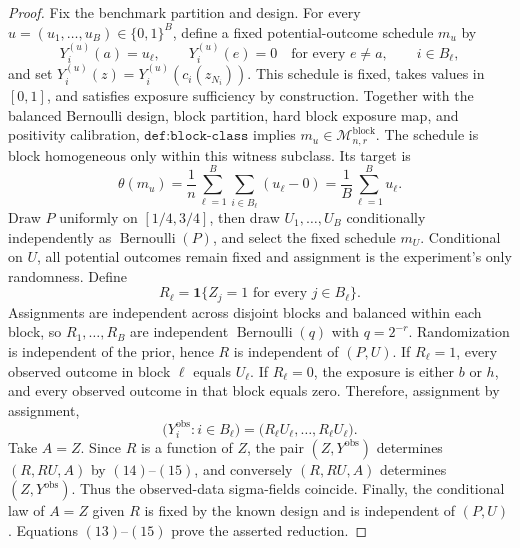\documentclass{article}
\begin{document}
\begin{proof}
Fix the benchmark partition and design. For every \(u=(u_1,\ldots,u_B)\in\{0,1\}^B\), define a fixed potential-outcome schedule \(m_u\) by
\[
Y_i^{(u)}(a)=u_\ell,
\qquad
Y_i^{(u)}(e)=0\quad\text{for every }e\ne a,
\qquad i\in B_\ell,
\tag{12}
\]
and set \(Y_i^{(u)}(z)=Y_i^{(u)}(c_i(z_{N_i}))\). This schedule is fixed, takes values in \([0,1]\), and satisfies exposure sufficiency by construction. Together with the balanced Bernoulli design, block partition, hard block exposure map, and positivity calibration, \(\texttt{def:block-class}\) implies \(m_u\in\mathcal M_{n,r}^{\mathrm{block}}\). The schedule is block homogeneous only within this witness subclass. Its target is
\[
\theta(m_u)
=\frac1n\sum_{\ell=1}^B\sum_{i\in B_\ell}(u_\ell-0)
=\frac1B\sum_{\ell=1}^B u_\ell.
\tag{13}
\]
Draw \(P\) uniformly on \([1/4,3/4]\), then draw \(U_1,\ldots,U_B\) conditionally independently as \(\operatorname{Bernoulli}(P)\), and select the fixed schedule \(m_U\). Conditional on \(U\), all potential outcomes remain fixed and assignment is the experiment's only randomness. Define
\[
R_\ell=\mathbf 1\{Z_j=1\text{ for every }j\in B_\ell\}.
\tag{14}
\]
Assignments are independent across disjoint blocks and balanced within each block, so \(R_1,\ldots,R_B\) are independent \(\operatorname{Bernoulli}(q)\) with \(q=2^{-r}\). Randomization is independent of the prior, hence \(R\) is independent of \((P,U)\). If \(R_\ell=1\), every observed outcome in block \(\ell\) equals \(U_\ell\). If \(R_\ell=0\), the exposure is either \(b\) or \(h\), and every observed outcome in that block equals zero. Therefore, assignment by assignment,
\[
\bigl(Y_i^{\mathrm{obs}}:i\in B_\ell\bigr)
=\bigl(R_\ell U_\ell,\ldots,R_\ell U_\ell\bigr).
\tag{15}
\]
Take \(A=Z\). Since \(R\) is a function of \(Z\), the pair \((Z,Y^{\mathrm{obs}})\) determines \((R,RU,A)\) by \((14)\)--\((15)\), and conversely \((R,RU,A)\) determines \((Z,Y^{\mathrm{obs}})\). Thus the observed-data sigma-fields coincide. Finally, the conditional law of \(A=Z\) given \(R\) is fixed by the known design and is independent of \((P,U)\). Equations \((13)\)--\((15)\) prove the asserted reduction.
\end{proof}
\end{document}
